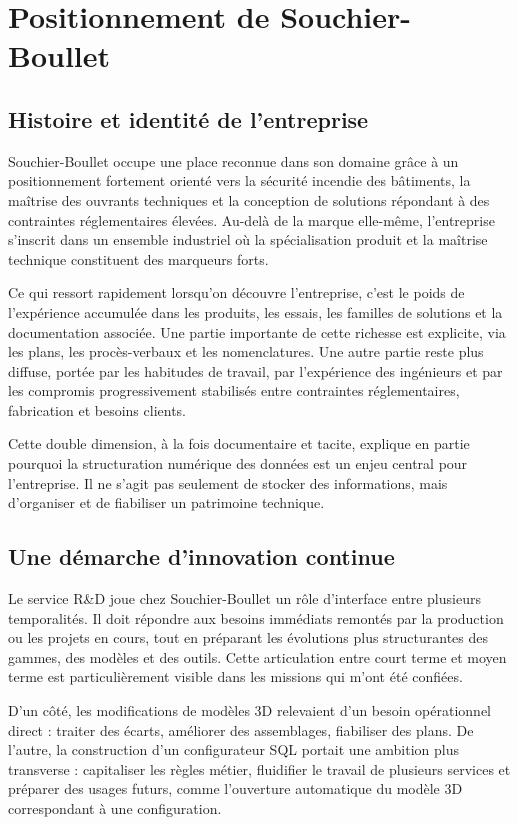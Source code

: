 \section{Positionnement de Souchier-Boullet}

\subsection{Histoire et identité de l'entreprise}

Souchier-Boullet occupe une place reconnue dans son domaine grâce à un positionnement fortement orienté vers la sécurité incendie des bâtiments, la maîtrise des ouvrants techniques et la conception de solutions répondant à des contraintes réglementaires élevées. Au-delà de la marque elle-même, l'entreprise s'inscrit dans un ensemble industriel où la spécialisation produit et la maîtrise technique constituent des marqueurs forts.

Ce qui ressort rapidement lorsqu'on découvre l'entreprise, c'est le poids de l'expérience accumulée dans les produits, les essais, les familles de solutions et la documentation associée. Une partie importante de cette richesse est explicite, via les plans, les procès-verbaux et les nomenclatures. Une autre partie reste plus diffuse, portée par les habitudes de travail, par l'expérience des ingénieurs et par les compromis progressivement stabilisés entre contraintes réglementaires, fabrication et besoins clients.

Cette double dimension, à la fois documentaire et tacite, explique en partie pourquoi la structuration numérique des données est un enjeu central pour l'entreprise. Il ne s'agit pas seulement de stocker des informations, mais d'organiser et de fiabiliser un patrimoine technique.

\subsection{Une démarche d'innovation continue}

Le service R\&D joue chez Souchier-Boullet un rôle d'interface entre plusieurs temporalités. Il doit répondre aux besoins immédiats remontés par la production ou les projets en cours, tout en préparant les évolutions plus structurantes des gammes, des modèles et des outils. Cette articulation entre court terme et moyen terme est particulièrement visible dans les missions qui m'ont été confiées.

D'un côté, les modifications de modèles 3D relevaient d'un besoin opérationnel direct : traiter des écarts, améliorer des assemblages, fiabiliser des plans. De l'autre, la construction d'un configurateur SQL portait une ambition plus transverse : capitaliser les règles métier, fluidifier le travail de plusieurs services et préparer des usages futurs, comme l'ouverture automatique du modèle 3D correspondant à une configuration.


